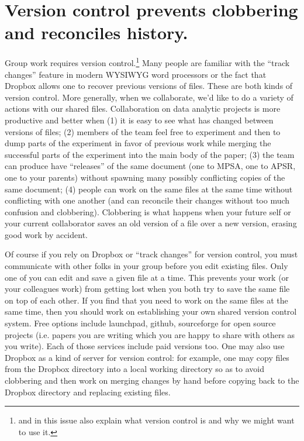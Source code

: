 \documentclass[12pt]{article}
\begin{document}
\section{Version control prevents clobbering and reconciles history.}\label{sec:vers-contr-prev}

Group work requires version control.\footnote{
  \citet{fredrickson2011tpm} and \citet{healy2011tpm} in this issue
  also explain what version control is and why we might want to use
  it.} Many people are familiar with the ``track changes'' feature in
modern WYSIWYG word processors or the fact that Dropbox allows one to
recover previous versions of files. These are both kinds of version
control. More generally, when we collaborate, we'd like to do a variety
of actions with our shared files. Collaboration on data analytic
projects is more productive and better when (1) it is easy to see what
has changed between versions of files; (2) members of the team feel
free to experiment and then to dump parts of the experiment in favor
of previous work while merging the successful parts of the experiment
into the main body of the paper; (3) the team can produce have
``releases'' of the same document (one to MPSA, one to APSR,
one to your parents) without spawning many possibly conflicting copies
of the same document; (4) people can work on the same files at
the same time without conflicting with one another (and can reconcile
their changes without too much confusion and clobbering).  Clobbering
is what happens when your future self or your current collaborator
saves an old version of a file over a new version, erasing good
work by accident.

Of course if you rely on Dropbox or ``track changes'' for version
control, you must communicate with other folks in your group before
you edit existing files. Only one of you can edit and save a given
file at a time. This prevents your work (or your colleagues work) from
getting lost when you both try to save the same file on top of each
other. If you find that you need to work on the same files at the same
time, then you should work on establishing your own shared version
control system. Free options include launchpad, github, sourceforge
for open source projects (i.e. papers you are writing which you are
happy to share with others as you write). Each of those services
include paid versions too. One may also use Dropbox as a kind of
server for version control: for example, one may copy files from the
Dropbox directory into a local working directory so as to avoid
clobbering and then work on merging changes by hand before copying
back to the Dropbox directory and replacing existing files.
\end{document}
